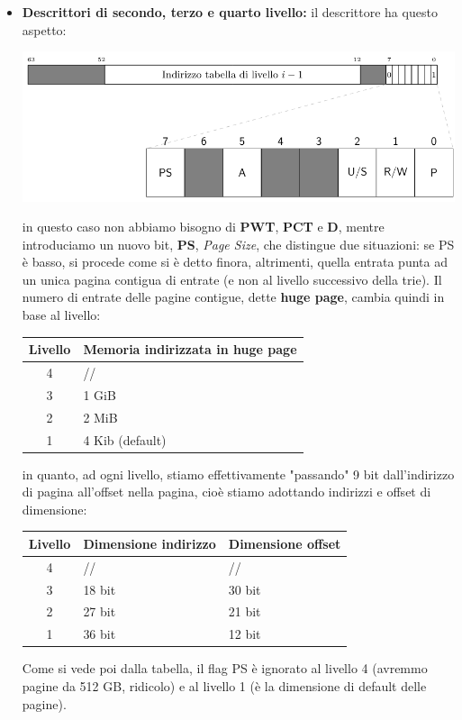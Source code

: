 \documentclass[a4paper,11pt]{article}
\begin{document}
\begin{itemize}
	\item \textbf{Descrittori di secondo, terzo e quarto livello:} il descrittore ha questo aspetto:
\begin{center}
	\includegraphics[scale=0.6]{../figures/mmu_level234.png}
\end{center}
		in questo caso non abbiamo bisogno di \textbf{PWT}, \textbf{PCT} e \textbf{D}, mentre introduciamo un nuovo bit, \textbf{PS}, \textit{Page Size}, che distingue due situazioni: se PS è basso, si procede come si è detto finora, altrimenti, quella entrata punta ad un unica pagina contigua di entrate (e non al livello successivo della trie).
		Il numero di entrate delle pagine contigue, dette \textbf{huge page}, cambia quindi in base al livello:
\begin{table}[H]
	\center {}
	\begin{tabular} { c | p{6cm} }
		\bfseries Livello & \bfseries Memoria indirizzata in huge page\\ 
		\hline 
		4 & // \\ 
		3 & 1 GiB \\ 
		2 & 2 MiB \\ 
		1 & 4 Kib (default) \\
	\end{tabular}
\end{table}
in quanto, ad ogni livello, stiamo effettivamente "passando" 9 bit dall'indirizzo di pagina all'offset nella pagina, cioè stiamo adottando indirizzi e offset di dimensione:
\begin{table}[H]
	\center {}
	\begin{tabular} { c | p{5cm} | p{5cm} }
		\bfseries Livello & \bfseries Dimensione indirizzo & \bfseries Dimensione offset \\ 
		\hline 
		4 & // & // \\ 
		3 & 18 bit & 30  bit \\
		2 & 27 bit & 21 bit \\ 
		1 & 36 bit & 12 bit \\
	\end{tabular}
\end{table}

Come si vede poi dalla tabella, il flag PS è ignorato al livello 4 (avremmo pagine da 512 GB, ridicolo) e al livello 1 (è la dimensione di default delle pagine).
\end{itemize}
\end{document}
